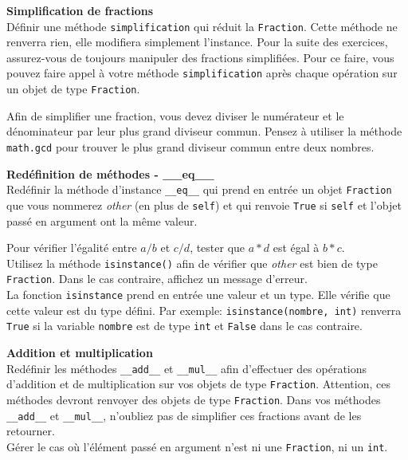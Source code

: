 \begin{Exercice} [10 minutes] \textbf{Simplification de fractions}\\
	Définir une méthode \lstinline{simplification} qui réduit la \lstinline{Fraction}. Cette méthode ne renverra rien, elle modifiera simplement l'instance. Pour la suite des exercices, assurez-vous de toujours manipuler des fractions simplifiées. Pour ce faire, vous pouvez faire appel à votre méthode \lstinline{simplification} après chaque opération sur un objet de type \lstinline{Fraction}.

	\begin{conseil}
		Afin de simplifier une fraction, vous devez diviser le numérateur et le dénominateur par leur plus grand diviseur commun. Pensez à utiliser la méthode \lstinline{math.gcd} pour trouver le plus grand diviseur commun entre deux nombres.
	\end{conseil}
\end{Exercice}

\begin{Exercice}[15 minutes] \textbf{Redéfinition de méthodes - \_\_eq\_\_}\\
	Redéfinir la méthode d'instance \lstinline{__eq__} qui prend en entrée un objet \lstinline{Fraction} que vous nommerez \textit{other} (en plus de \lstinline{self}) et qui renvoie \lstinline{True} si \lstinline{self} et l'objet passé en argument ont la même valeur.
	\begin{conseil}
		Pour vérifier l'égalité entre $a/b$ et $c/d$, tester que $a*d$ est égal à $b*c$. \\
		Utilisez la méthode \lstinline{isinstance()} afin de vérifier que \textit{other} est bien de type \lstinline{Fraction}. Dans le cas contraire, affichez un message d'erreur.
		\\La fonction \lstinline{isinstance} prend en entrée une valeur et un type. Elle vérifie que cette valeur est du type défini. Par exemple: \lstinline{isinstance(nombre, int)} renverra \lstinline{True} si la variable \lstinline{nombre} est de type \lstinline{int} et \lstinline{False} dans le cas contraire.
	\end{conseil}
\end{Exercice}

\begin{Exercice}[15 minutes] \textbf{Addition et multiplication}\\
	Redéfinir les méthodes \lstinline{__add__} et \lstinline{__mul__} afin d'effectuer des opérations d'addition et de multiplication sur vos objets de type \lstinline{Fraction}. Attention, ces méthodes devront renvoyer des objets de type \lstinline{Fraction}. Dans vos méthodes \lstinline{__add__} et \lstinline{__mul__}, n'oubliez pas de simplifier ces fractions avant de les retourner.\\
	Gérer le cas où l'élément passé en argument n'est ni une \lstinline{Fraction}, ni un \lstinline{int}.
\end{Exercice}


